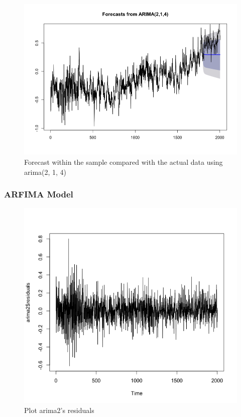\documentclass[a4paper,11pt]{article}
\begin{document}
\begin{figure}[H]
\centering
\caption{Forecast within the sample compared with the actual data using arima(2, 1, 4)}
\includegraphics[scale=.5]{arima_sample.png}
\end{figure}


\subsubsection{ARFIMA Model}

\begin{figure}[H]
\centering
\caption{Plot arima2's residuals}
\includegraphics[scale=.5]{arima_residuals.png}
\end{figure}
\end{document}
